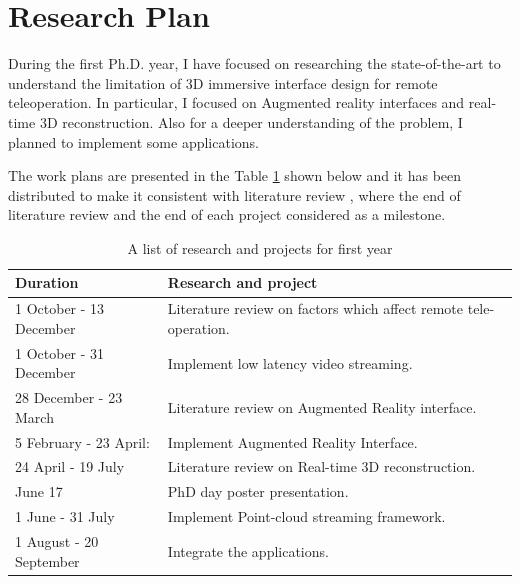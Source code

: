 \section{Research Plan}

During the first Ph.D. year, I have focused on researching the state-of-the-art to understand the limitation of 3D immersive interface design for remote teleoperation. In particular, I focused on Augmented reality interfaces and real-time 3D reconstruction. Also for a deeper understanding of the problem, I planned to implement some applications.

The work plans are presented in the Table \ref{table:plan} shown below and it has been distributed to make it consistent with literature review , where the end of literature review and the end of each project considered as a milestone.

\begin{table}[ht] 
\begin{tabular}{ p{4.5cm} p{10cm}}
 \hline
 \rowcolor{lightgray}  Duration & Research and project \\
\hline

 1 October - 13 December &  Literature review on factors which affect remote tele-operation. \\

\rowcolor{lightgray} 1 October - 31 December &  Implement low latency video streaming. \\

 28 December - 23 March &  Literature review on Augmented Reality interface. \\

\rowcolor{lightgray} 5 February - 23 April: & Implement Augmented Reality Interface. \\

 24 April - 19 July & Literature review on Real-time 3D reconstruction. \\

\rowcolor{lightgray} June 17 &  PhD day poster presentation.\\

 1 June - 31 July & Implement Point-cloud streaming framework.\\
 
 \rowcolor{lightgray} 1 August - 20 September &  Integrate the applications.\\

\end{tabular}
\caption{A list of research and projects for first year}
\label{table:plan}
\end{table}

